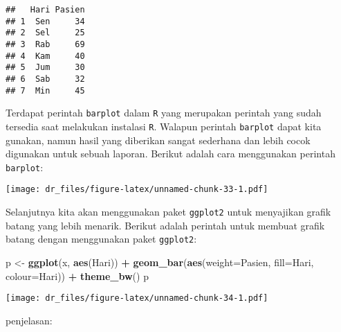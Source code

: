 \documentclass[
]{book}
\newenvironment{Shaded}{\begin{snugshade}}{\end{snugshade}}
\newcommand{\DataTypeTok}[1]{\textcolor[rgb]{0.13,0.29,0.53}{#1}}
\newcommand{\KeywordTok}[1]{\textcolor[rgb]{0.13,0.29,0.53}{\textbf{#1}}}
\newcommand{\NormalTok}[1]{#1}
\newcommand{\OperatorTok}[1]{\textcolor[rgb]{0.81,0.36,0.00}{\textbf{#1}}}
\newcommand{\StringTok}[1]{\textcolor[rgb]{0.31,0.60,0.02}{#1}}
\begin{document}
\begin{verbatim}
##   Hari Pasien
## 1  Sen     34
## 2  Sel     25
## 3  Rab     69
## 4  Kam     40
## 5  Jum     30
## 6  Sab     32
## 7  Min     45
\end{verbatim}

Terdapat perintah \texttt{barplot} dalam \texttt{R} yang merupakan perintah yang sudah tersedia saat melakukan instalasi \texttt{R}. Walapun perintah \texttt{barplot} dapat kita gunakan, namun hasil yang diberikan sangat sederhana dan lebih cocok digunakan untuk sebuah laporan. Berikut adalah cara menggunakan perintah \texttt{barplot}:

\begin{Shaded}
\end{Shaded}

\texttt{[image: dr\_files/figure-latex/unnamed-chunk-33-1.pdf]}

Selanjutnya kita akan menggunakan paket \texttt{ggplot2} untuk menyajikan grafik batang yang lebih menarik. Berikut adalah perintah untuk membuat grafik batang dengan menggunakan paket \texttt{ggplot2}:

\begin{Shaded}
\begin{Highlighting}[]
\NormalTok{p <-}\StringTok{ }\KeywordTok{ggplot}\NormalTok{(x, }\KeywordTok{aes}\NormalTok{(Hari)) }\OperatorTok{+}\StringTok{ }
\StringTok{  }\KeywordTok{geom_bar}\NormalTok{(}\KeywordTok{aes}\NormalTok{(}\DataTypeTok{weight=}\NormalTok{Pasien, }\DataTypeTok{fill=}\NormalTok{Hari, }\DataTypeTok{colour=}\NormalTok{Hari)) }\OperatorTok{+}
\StringTok{  }\KeywordTok{theme_bw}\NormalTok{()}
\NormalTok{p}
\end{Highlighting}
\end{Shaded}

\texttt{[image: dr\_files/figure-latex/unnamed-chunk-34-1.pdf]}

penjelasan:
\end{document}
